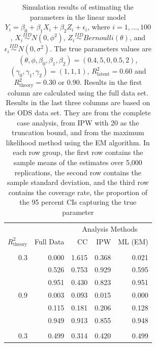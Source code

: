 \documentclass[
  12pt,
]{article}
\begin{document}
\begin{table}[H]

\caption{\label{tab:unnamed-chunk-1}Simulation results of estimating the parameters in the linear model $Y_i = \beta_0 + \beta_1 X_i + \beta_2 Z_i + \epsilon_i$, where $i = 1,...,100$, $X_i \overset{IID}{\sim} N(0, \phi^2)$, $Z_i \overset{IID}{\sim} Bernoulli(\theta)$, and $\epsilon_i \overset{IID}{\sim} N(0, \sigma^2)$. The true parameters values are $(\theta, \phi, \beta_0, \beta_1, \beta_2) = (0.4, 5, 0, 0.5, 2)$, $(\gamma_0, \gamma_1, \gamma_2) = (1, 1, 1)$, $R_{\mathrm{latent}}^2 = 0.60$ and $R_{\mathrm{theory}}^2 = 0.30 \text{ or } 0.90$. Results in the first column are calculated using the full data set. Results in the last three columns are based on the ODS data set. They are from the complete case analysis, from IPW with 20 as the truncation bound, and from the maximum likelihood method using the EM algorithm. In each row group, the first row contains the sample means of the estimates over 5,000 replications, the second row contains the sample standard deviation, and the third row contains the coverage rate, the proportion of the 95 percent CIs capturing the true parameter}
\centering
\begin{tabular}[t]{rrrrr}
\toprule
\multicolumn{2}{c}{ } & \multicolumn{3}{c}{Analysis Methods} \\
\cmidrule(l{3pt}r{3pt}){3-5}
$R_{\mathrm{theory}}^{2}$ & Full Data & CC & IPW & ML (EM)\\
\midrule
\addlinespace[0.3em]
\multicolumn{5}{l}{\textbf{$\beta_0 = 0$}}\\
\hspace{1em}0.3 & 0.000 & 1.615 & 0.368 & 0.021\\
\hspace{1em} & 0.526 & 0.753 & 0.929 & 0.595\\
\hspace{1em} & 0.951 & 0.430 & 0.823 & 0.951\\
\hspace{1em}0.9 & 0.003 & 0.093 & 0.015 & 0.000\\
\hspace{1em} & 0.115 & 0.181 & 0.206 & 0.128\\
\hspace{1em} & 0.949 & 0.913 & 0.855 & 0.948\\
\addlinespace[0.3em]
\multicolumn{5}{l}{\textbf{$\beta_1 = 0.5$}}\\
\hspace{1em}0.3 & 0.499 & 0.314 & 0.420 & 0.499\\

\end{tabular}
\end{table}
\end{document}
